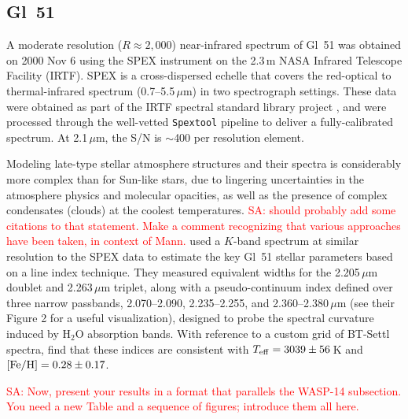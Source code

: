 \documentclass[iop,floatfix]{emulateapj}
\newcommand{\comm}[1]{ \textcolor{red}{SA: #1}}
\begin{document}
\subsection{Gl~51}

A moderate resolution ($R\approx2,000$) near-infrared spectrum of Gl~51 was obtained on 2000 
Nov 6 using the SPEX instrument \citep{rayner03} on the 2.3\,m NASA Infrared Telescope Facility 
(IRTF).  SPEX is a cross-dispersed echelle that covers the red-optical to thermal-infrared spectrum 
(0.7--5.5\,$\mu$m) in two spectrograph settings.  These data were obtained as part of the IRTF 
spectral standard library project \citep{cushing05,rayner09}, and were processed through the 
well-vetted {\tt Spextool} pipeline \citep{cushing04,vacca03} to deliver a fully-calibrated 
spectrum.  At 2.1\,$\mu$m, the S/N is $\sim$400 per resolution element.

Modeling late-type stellar atmosphere structures and their spectra is considerably more complex 
than for Sun-like stars, due to lingering uncertainties in the atmosphere physics and molecular 
opacities, as well as the presence of complex condensates (clouds) at the coolest temperatures.  
\comm{should probably add some citations to that statement.  Make a comment recognizing that 
various approaches have been taken, in context of Mann.}  \citet{rojas-ayala12} used a $K$-band 
spectrum at similar resolution to the SPEX data to estimate the key Gl~51 stellar parameters based 
on a line index technique.  They measured equivalent widths for the 2.205\,$\mu$m  
doublet and 2.263\,$\mu$m  triplet, along with a pseudo-continuum index defined over 
three narrow passbands, 2.070--2.090, 2.235--2.255, and 2.360--2.380\,$\mu$m (see their Figure 2 
for a useful visualization), designed to probe the spectral curvature induced by H$_2$O absorption 
bands.  With reference to a custom grid of {\sc BT-Settl} spectra, \citet{rojas-ayala12} find that 
these indices are consistent with $T_{\rm eff} = 3039\pm56$\,K and $[{\rm Fe/H}] = 0.28\pm0.17$.  

\comm{Now, present your results in a format that parallels the WASP-14 subsection.  You need a new 
Table and a sequence of figures; introduce them all here.}
\end{document}
